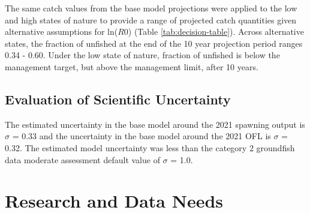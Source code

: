 \documentclass[11pt,
  english,
  a4paper,
]{article}
\begin{document}
\leavevmode\tagmcend\tagstructend\par


The same catch values from the base model projections were applied to the low and high states of nature to provide a range of projected catch quantities given alternative assumptions for ln({\(R0\)\leavevmode\tagmcend\tagstructend}) (Table \ref{tab:decision-table}). Across alternative states, the fraction of unfished at the end of the 10 year projection period ranges 0.34 - 0.60. Under the low state of nature, fraction of unfished is below the management target, but above the management limit, after 10 years.

\leavevmode\tagmcend\tagstructend\par


\hypertarget{evaluation-of-scientific-uncertainty}{%
\subsection{Evaluation of Scientific Uncertainty}\label{evaluation-of-scientific-uncertainty}}

\leavevmode\tagmcend\tagstructend


The estimated uncertainty in the base model around the 2021 spawning output is {\(\sigma\)\leavevmode\tagmcend\tagstructend} = 0.33 and the uncertainty in the base model around the 2021 OFL is {\(\sigma\)\leavevmode\tagmcend\tagstructend} = 0.32. The estimated model uncertainty was less than the category 2 groundfish data moderate assessment default value of {\(\sigma\)\leavevmode\tagmcend\tagstructend} = 1.0.

\leavevmode\tagmcend\tagstructend\par


\hypertarget{research-and-data-needs}{%
\section{Research and Data Needs}\label{research-and-data-needs}}
\end{document}
